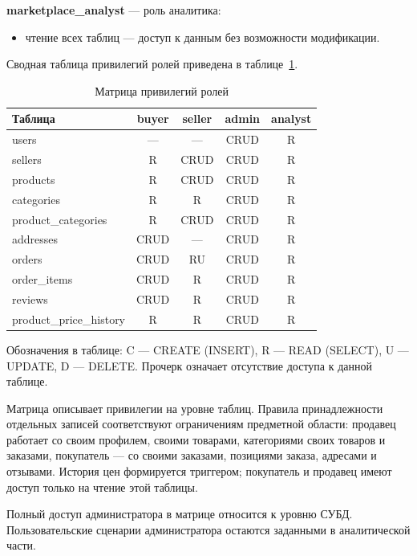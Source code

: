 \textbf{marketplace\_analyst} --- роль аналитика:
\begin{itemize}
    \item чтение всех таблиц --- доступ к данным без возможности модификации.
\end{itemize}

Сводная таблица привилегий ролей приведена в таблице~\ref{tbl:role_matrix}.

\begin{table}[H]
    \caption{Матрица привилегий ролей}
    \label{tbl:role_matrix}
    \begin{tabular}{|l|c|c|c|c|}
        \hline
        \textbf{Таблица} & \textbf{buyer} & \textbf{seller} & \textbf{admin} & \textbf{analyst} \\ \hline
        users & --- & --- & CRUD & R \\ \hline
        sellers & R & CRUD & CRUD & R \\ \hline
        products & R & CRUD & CRUD & R \\ \hline
        categories & R & R & CRUD & R \\ \hline
        product\_categories & R & CRUD & CRUD & R \\ \hline
        addresses & CRUD & --- & CRUD & R \\ \hline
        orders & CRUD & RU & CRUD & R \\ \hline
        order\_items & CRUD & R & CRUD & R \\ \hline
        reviews & CRUD & R & CRUD & R \\ \hline
        product\_price\_history & R & R & CRUD & R \\ \hline
    \end{tabular}
\end{table}

Обозначения в таблице: C --- CREATE (INSERT), R --- READ (SELECT), U --- UPDATE, D --- DELETE. Прочерк означает отсутствие доступа к данной таблице.

Матрица описывает привилегии на уровне таблиц. Правила принадлежности отдельных записей соответствуют ограничениям предметной области: продавец работает со своим профилем, своими товарами, категориями своих товаров и заказами, покупатель --- со своими заказами, позициями заказа, адресами и отзывами. История цен формируется триггером; покупатель и продавец имеют доступ только на чтение этой таблицы.

Полный доступ администратора в матрице относится к уровню СУБД. Пользовательские сценарии администратора остаются заданными в аналитической части.
